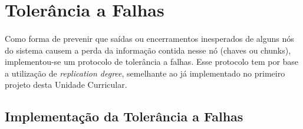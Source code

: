 \documentclass[11pt,oneside]{book}
\begin{document}
\pagebreak

\section{Tolerância a Falhas}

\paragraph{}
    Como forma de prevenir que saídas ou encerramentos inesperados de alguns nós do 
    sistema causem a perda da informação contida nesse nó (chaves ou chunks), implementou-se
    um protocolo de tolerância a falhas. Esse protocolo tem por base a utilização
    de \textit{replication degree}, semelhante ao já implementado no primeiro projeto desta
    Unidade Curricular.

\subsection{Implementação da Tolerância a Falhas}
\end{document}
